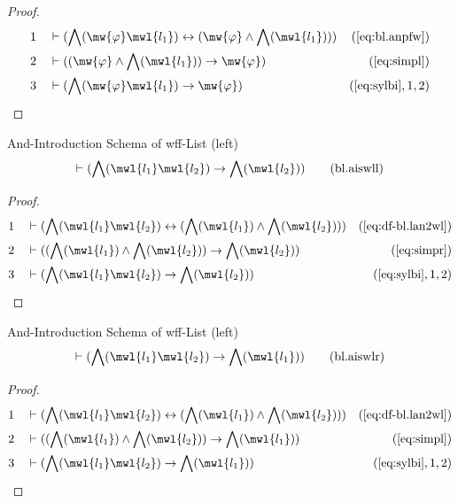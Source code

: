 \begin{proof}
\begin{align}
  1 &&  & \vdash ( \bigwedge( \mw{\varphi} \mwl{l_1} ) \leftrightarrow ( \mw{\varphi} \wedge \bigwedge( \mwl{l_1} ) ) )&(\mbox{\ref{eq:bl.anpfw}})\notag
  \\ 2 &&  & \vdash ( ( \mw{\varphi} \wedge \bigwedge( \mwl{l_1} ) ) \rightarrow \mw{\varphi} )&(\mbox{\ref{eq:simpl}})\notag
  \\ 3 &&  & \vdash ( \bigwedge( \mw{\varphi} \mwl{l_1} ) \rightarrow \mw{\varphi} )&(\mbox{\ref{eq:sylbi}},1,2)\notag
\end{align}
\end{proof}

\begin{lemma} And-Introduction Schema of wff-List
(left)
\begin{align}
\vdash ( \bigwedge( \mwl{l_1} \mwl{l_2} ) \rightarrow \bigwedge( \mwl{l_2} )
    )\label{eq:bl.aiswll}\tag{bl.aiswll}
\end{align}
\end{lemma}

\begin{proof}
\begin{align}
  1 &&  & \vdash ( \bigwedge( \mwl{l_1} \mwl{l_2} ) \leftrightarrow ( \bigwedge( \mwl{l_1} ) \wedge \bigwedge( \mwl{l_2} ) ) )&(\mbox{\ref{eq:df-bl.lan2wl}})\notag
  \\ 2 &&  & \vdash ( ( \bigwedge( \mwl{l_1} ) \wedge \bigwedge( \mwl{l_2} ) ) \rightarrow \bigwedge( \mwl{l_2} ) )&(\mbox{\ref{eq:simpr}})\notag
  \\ 3 &&  & \vdash ( \bigwedge( \mwl{l_1} \mwl{l_2} ) \rightarrow \bigwedge( \mwl{l_2} ) )&(\mbox{\ref{eq:sylbi}},1,2)\notag
\end{align}
\end{proof}

\begin{lemma} And-Introduction Schema of wff-List
(left)
\begin{align}
\vdash ( \bigwedge( \mwl{l_1} \mwl{l_2} ) \rightarrow \bigwedge( \mwl{l_1} )
    )\label{eq:bl.aiswlr}\tag{bl.aiswlr}
\end{align}
\end{lemma}

\begin{proof}
\begin{align}
  1 &&  & \vdash ( \bigwedge( \mwl{l_1} \mwl{l_2} ) \leftrightarrow ( \bigwedge( \mwl{l_1} ) \wedge \bigwedge( \mwl{l_2} ) ) )&(\mbox{\ref{eq:df-bl.lan2wl}})\notag
  \\ 2 &&  & \vdash ( ( \bigwedge( \mwl{l_1} ) \wedge \bigwedge( \mwl{l_2} ) ) \rightarrow \bigwedge( \mwl{l_1} ) )&(\mbox{\ref{eq:simpl}})\notag
  \\ 3 &&  & \vdash ( \bigwedge( \mwl{l_1} \mwl{l_2} ) \rightarrow \bigwedge( \mwl{l_1} ) )&(\mbox{\ref{eq:sylbi}},1,2)\notag
\end{align}
\end{proof}

